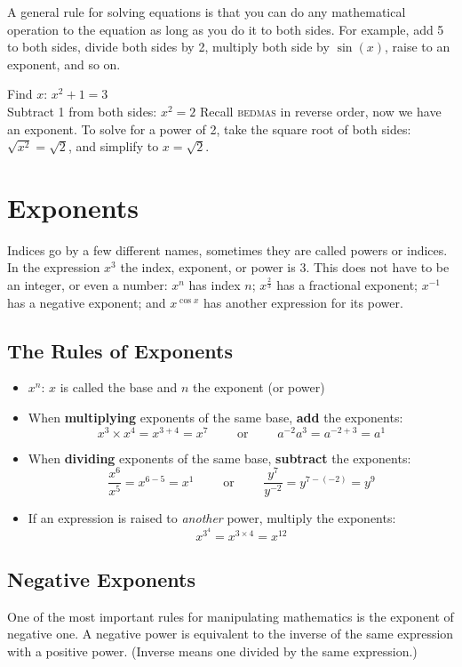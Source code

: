\begin{tcolorbox}
A general rule for solving equations is that you can do any mathematical operation to the equation as long as you do it to both sides. For example, add 5 to both sides, divide both sides by 2, multiply both side by $\sin(x)$, raise to an exponent, and so on.
\end{tcolorbox}

\example Find $x$: $x^2+1=3$\medskip\\
\solution Subtract 1 from both sides: $x^2=2$ Recall \textsc{bedmas} in reverse order, now we have an exponent. To solve for a power of 2, take the square root of both sides: $\sqrt{x^2}=\sqrt{2}$, and simplify to $x=\sqrt{2}$.
\section*{Exponents}
Indices go by a few different names, sometimes they are called powers or indices. In the expression $x^3$ the index, exponent, or power is $3$. This does not have to be an integer, or even a number: $x^n$ has index $n$; $x^{\frac{2}{3}}$ has a fractional exponent; $x^{-1}$ has a negative exponent; and $x^{\cos x}$ has another expression for its power.

\subsection*{The Rules of Exponents}
\begin{tcolorbox}
	\begin{itemize}
		\item $x^n$: $x$ is called the base and $n$ the exponent (or power)
		\item When \textbf{multiplying} exponents of the same base, \textbf{add} the exponents: \[x^3\times x^4=x^{3+4}=x^7\qquad\text{ or }\qquad a^{-2} a^3=a^{-2+3}=a^1\]
		\item When \textbf{dividing} exponents of the same base, \textbf{subtract} the exponents:\[\frac{x^6}{x^5}=x^{6-5}=x^1\qquad\text{ or }\qquad \frac{y^7}{y^{-2}}=y^{7-(-2)}=y^9\]
		\item If an expression is raised to \textit{another} power, multiply the exponents:
		\[ x^{3^4}=x^{3\times 4}=x^{12}\]
	\end{itemize}
\end{tcolorbox}	

\subsection*{Negative Exponents}
One of the most important rules for manipulating mathematics is the exponent of negative one. A negative power is equivalent to the inverse of the same expression with a positive power. (Inverse means one divided by the same expression.)\\

